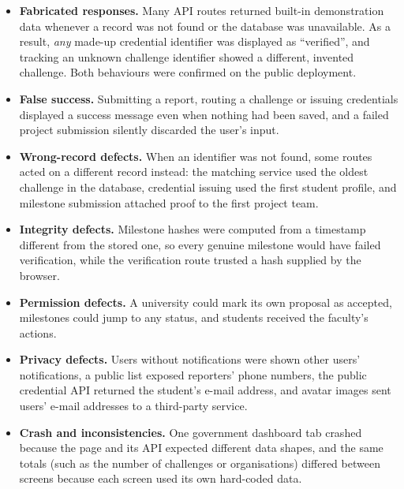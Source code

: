 \begin{itemize}
  \item \textbf{Fabricated responses.} Many API routes returned built-in demonstration data whenever a record was not found or the database was unavailable. As a result, \emph{any} made-up credential identifier was displayed as ``verified'', and tracking an unknown challenge identifier showed a different, invented challenge. Both behaviours were confirmed on the public deployment.
  \item \textbf{False success.} Submitting a report, routing a challenge or issuing credentials displayed a success message even when nothing had been saved, and a failed project submission silently discarded the user's input.
  \item \textbf{Wrong-record defects.} When an identifier was not found, some routes acted on a different record instead: the matching service used the oldest challenge in the database, credential issuing used the first student profile, and milestone submission attached proof to the first project team.
  \item \textbf{Integrity defects.} Milestone hashes were computed from a timestamp different from the stored one, so every genuine milestone would have failed verification, while the verification route trusted a hash supplied by the browser.
  \item \textbf{Permission defects.} A university could mark its own proposal as accepted, milestones could jump to any status, and students received the faculty's actions.
  \item \textbf{Privacy defects.} Users without notifications were shown other users' notifications, a public list exposed reporters' phone numbers, the public credential API returned the student's e-mail address, and avatar images sent users' e-mail addresses to a third-party service.
  \item \textbf{Crash and inconsistencies.} One government dashboard tab crashed because the page and its API expected different data shapes, and the same totals (such as the number of challenges or organisations) differed between screens because each screen used its own hard-coded data.
\end{itemize}

